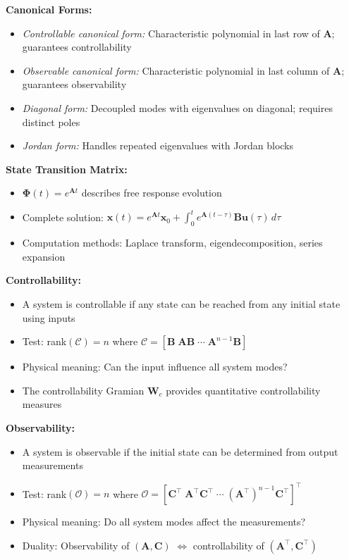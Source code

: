 \textbf{Canonical Forms:}
\begin{itemize}
    \item \textit{Controllable canonical form:} Characteristic polynomial in last row of $\mathbf{A}$; guarantees controllability
    \item \textit{Observable canonical form:} Characteristic polynomial in last column of $\mathbf{A}$; guarantees observability
    \item \textit{Diagonal form:} Decoupled modes with eigenvalues on diagonal; requires distinct poles
    \item \textit{Jordan form:} Handles repeated eigenvalues with Jordan blocks
\end{itemize}

\textbf{State Transition Matrix:}
\begin{itemize}
    \item $\boldsymbol{\Phi}(t) = e^{\mathbf{A}t}$ describes free response evolution
    \item Complete solution: $\mathbf{x}(t) = e^{\mathbf{A}t}\mathbf{x}_0 + \int_0^t e^{\mathbf{A}(t-\tau)}\mathbf{B}\mathbf{u}(\tau)\,d\tau$
    \item Computation methods: Laplace transform, eigendecomposition, series expansion
\end{itemize}

\textbf{Controllability:}
\begin{itemize}
    \item A system is controllable if any state can be reached from any initial state using inputs
    \item Test: rank$(\mathcal{C}) = n$ where $\mathcal{C} = [\mathbf{B} \; \mathbf{AB} \; \cdots \; \mathbf{A}^{n-1}\mathbf{B}]$
    \item Physical meaning: Can the input influence all system modes?
    \item The controllability Gramian $\mathbf{W}_c$ provides quantitative controllability measures
\end{itemize}

\textbf{Observability:}
\begin{itemize}
    \item A system is observable if the initial state can be determined from output measurements
    \item Test: rank$(\mathcal{O}) = n$ where $\mathcal{O} = [\mathbf{C}^\top \; \mathbf{A}^\top\mathbf{C}^\top \; \cdots \; (\mathbf{A}^\top)^{n-1}\mathbf{C}^\top]^\top$
    \item Physical meaning: Do all system modes affect the measurements?
    \item Duality: Observability of $(\mathbf{A}, \mathbf{C})$ $\Leftrightarrow$ controllability of $(\mathbf{A}^\top, \mathbf{C}^\top)$
\end{itemize}


